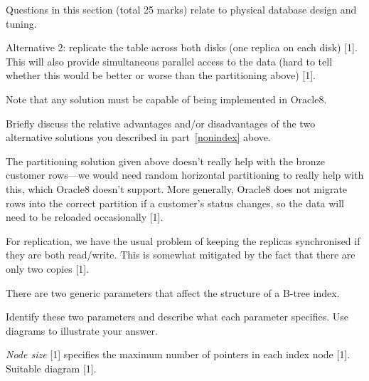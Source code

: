 \begin{examsection}{25}{}{Questions in this section (total 25 marks) relate to
physical database design and tuning.}
\begin{question}{10}
\begin{subquestion}{7}
\begin{subsubquestion}{5}
\begin{marking}
				Alternative 2: replicate the table across both disks (one
				replica on each disk) [1]. This will also provide simultaneous
				parallel access to the data (hard to tell whether this would be
				better or worse than the partitioning above) [1].
	
				Note that any solution must be capable of being implemented in
				Oracle8.
			\end{marking}
		\end{subsubquestion}

		\begin{subsubquestion}{2}
			Briefly discuss the relative advantages and/or disadvantages of the
			two alternative solutions you described in part~\ref{nonindex}
			above.
			\begin{marking}
				The partitioning solution given above doesn't really help with
				the bronze customer rows---we would need random horizontal
				partitioning to really help with this, which Oracle8 doesn't
				support. More generally, Oracle8 does not migrate rows into the
				correct partition if a customer's status changes, so the data
				will need to be reloaded occasionally [1].

				For replication, we have the usual problem of keeping the
				replicas synchronised if they are both read/write. This is
				somewhat mitigated by the fact that there are only two copies
				[1].
			\end{marking}
		\end{subsubquestion}
	\end{subquestion}
	

\end{question}


\newpage


\begin{question}{10}
	There are two generic parameters that affect the structure of a B-tree
	index.


	\begin{subquestion}{6}
		Identify these two parameters and describe what each parameter
		specifies. Use diagrams to illustrate your answer.
		\begin{marking}
			\emph{Node size} [1] specifies the maximum number of pointers in
			each index node [1]. Suitable diagram [1].


\end{marking}
\end{subquestion}
\end{question}
\end{examsection}
